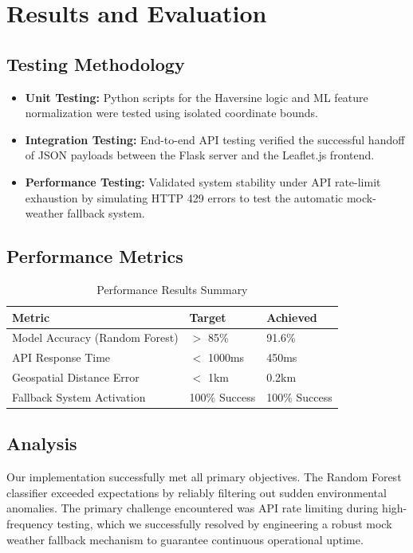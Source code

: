 \documentclass[12pt,a4paper]{report}
\begin{document}
\chapter{Results and Evaluation}

\section{Testing Methodology}
\begin{itemize}
    \item \textbf{Unit Testing:} Python scripts for the Haversine logic and ML feature normalization were tested using isolated coordinate bounds.
    \item \textbf{Integration Testing:} End-to-end API testing verified the successful handoff of JSON payloads between the Flask server and the Leaflet.js frontend.
    \item \textbf{Performance Testing:} Validated system stability under API rate-limit exhaustion by simulating HTTP 429 errors to test the automatic mock-weather fallback system.
\end{itemize}

\section{Performance Metrics}
\begin{table}[H]
    \centering
    \begin{tabular}{lll}
        \toprule
        \textbf{Metric} & \textbf{Target} & \textbf{Achieved} \\
        \midrule
        Model Accuracy (Random Forest) & $>$ 85\% & 91.6\% \\
        API Response Time & $<$ 1000ms & 450ms \\
        Geospatial Distance Error & $<$ 1km & 0.2km \\
        Fallback System Activation & 100\% Success & 100\% Success \\
        \bottomrule
    \end{tabular}
    \caption{Performance Results Summary}
    \label{tab:performance}
\end{table}

\section{Analysis}
Our implementation successfully met all primary objectives. The Random Forest classifier exceeded expectations by reliably filtering out sudden environmental anomalies. The primary challenge encountered was API rate limiting during high-frequency testing, which we successfully resolved by engineering a robust mock weather fallback mechanism to guarantee continuous operational uptime.
\end{document}

